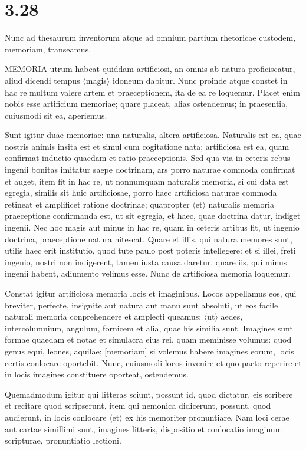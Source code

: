 \section*{3.28}

Nunc ad thesaurum inventorum atque ad omnium partium rhetoricae custodem, memoriam, transeamus.

MEMORIA utrum habeat quiddam artificiosi, an omnis ab natura proficiscatur, aliud dicendi tempus $\langle$magis$\rangle$ idoneum dabitur. Nunc proinde atque constet in hac re multum valere artem et praeceptionem, ita de ea re loquemur. Placet enim nobis esse artificium memoriae; quare placeat, alias ostendemus; in praesentia, cuiusmodi sit ea, aperiemus.

Sunt igitur duae memoriae: una naturalis, altera artificiosa. Naturalis est ea, quae nostris animis insita est et simul cum cogitatione nata; artificiosa est ea, quam confirmat inductio quaedam et ratio praeceptionis. Sed qua via in ceteris rebus ingenii bonitas imitatur saepe doctrinam, ars porro naturae commoda confirmat et auget, item fit in hac re, ut nonnumquam naturalis memoria, si cui data est egregia, similis sit huic artificiosae, porro haec artificiosa naturae commoda retineat et amplificet ratione doctrinae; quapropter $\langle$et$\rangle$ naturalis memoria praeceptione confirmanda est, ut sit egregia, et haec, quae doctrina datur, indiget ingenii. Nec hoc magis aut minus in hac re, quam in ceteris artibus fit, ut ingenio doctrina, praeceptione natura nitescat. Quare et illis, qui natura memores sunt, utilis haec erit institutio, quod tute paulo post poteris intellegere: et si illei, freti ingenio, nostri non indigerent, tamen iusta causa daretur, quare iis, qui minus ingenii habent, adiumento velimus esse. Nunc de artificiosa memoria loquemur.

Constat igitur artificiosa memoria locis et imaginibus. Locos appellamus eos, qui breviter, perfecte, insignite aut natura aut manu sunt absoluti, ut eos facile naturali memoria conprehendere et amplecti queamus: $\langle$ut$\rangle$ aedes, intercolumnium, angulum, fornicem et alia, quae his similia sunt. Imagines sunt formae quaedam et notae et simulacra eius rei, quam meminisse volumus: quod genus equi, leones, aquilae; [memoriam] si volemus habere imagines eorum, locis certis conlocare oportebit. Nunc, cuiusmodi locos invenire et quo pacto reperire et in locis imagines constituere oporteat, ostendemus.

Quemadmodum igitur qui litteras sciunt, possunt id, quod dictatur, eis scribere et recitare quod scripserunt, item qui nemonica didicerunt, possunt, quod audierunt, in locis conlocare $\langle$et$\rangle$ ex his memoriter pronuntiare. Nam loci cerae aut cartae simillimi sunt, imagines litteris, dispositio et conlocatio imaginum scripturae, pronuntiatio lectioni.

